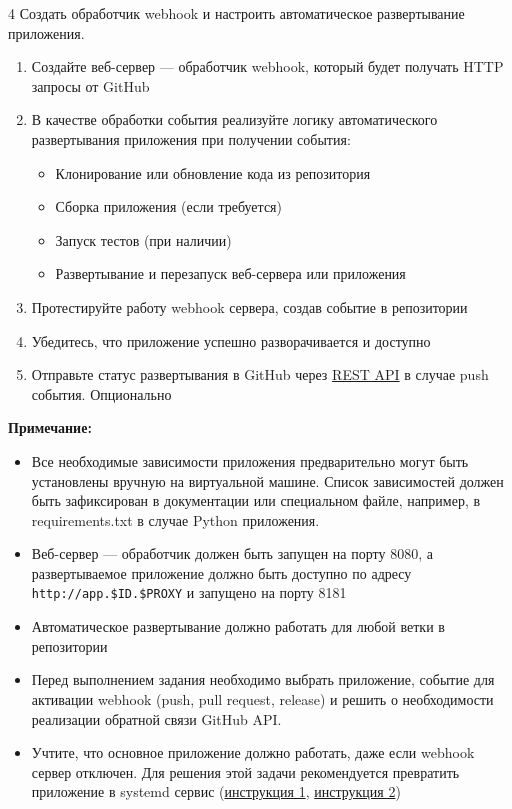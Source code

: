 \documentclass[12pt,a4paper]{article}
\begin{document}
\begin{task}{4}
    Создать обработчик webhook и настроить автоматическое развертывание приложения.
    
    \begin{enumerate}
        \item Создайте веб-сервер — обработчик webhook, который будет получать HTTP запросы от GitHub
        \item В качестве обработки события реализуйте логику автоматического развертывания приложения при получении события:
        \begin{itemize}
            \item Клонирование или обновление кода из репозитория
            \item Сборка приложения (если требуется)
            \item Запуск тестов (при наличии)
            \item Развертывание и перезапуск веб-сервера или приложения
        \end{itemize}
        \item Протестируйте работу webhook сервера, создав событие в репозитории
        \item Убедитесь, что приложение успешно разворачивается и доступно
        \item Отправьте статус развертывания в GitHub через \href{https://docs.github.com/en/rest/commits/statuses?apiVersion=2022-11-28#create-a-commit-status}{REST API} в случае push события. Опционально
    \end{enumerate}

    \textbf{Примечание:}
    \begin{itemize}
        \item Все необходимые зависимости приложения предварительно могут быть установлены вручную на виртуальной машине.
        Список зависимостей должен быть зафиксирован в документации или специальном файле, например, в requirements.txt в случае Python приложения.
        \item Веб-сервер — обработчик должен быть запущен на порту 8080, а развертываемое приложение должно быть доступно по адресу \texttt{http://app.\$ID.\$PROXY} и запущено на порту 8181
        \item Автоматическое развертывание должно работать для любой ветки в репозитории
        \item Перед выполнением задания необходимо выбрать приложение, событие для активации webhook (push, pull request, release) и решить о необходимости реализации обратной связи GitHub API.
        \item Учтите, что основное приложение должно работать, даже если webhook сервер отключен.
        Для решения этой задачи рекомендуется превратить приложение в systemd сервис (\href{https://webdock.io/en/docs/how-guides/app-installation-and-setup/how-daemonize-application-systemd}{инструкция 1}, \href{https://medium.com/@benmorel/creating-a-linux-service-with-systemd-611b5c8b91d6}{инструкция 2})
    \end{itemize}


\end{task}
\end{document}
